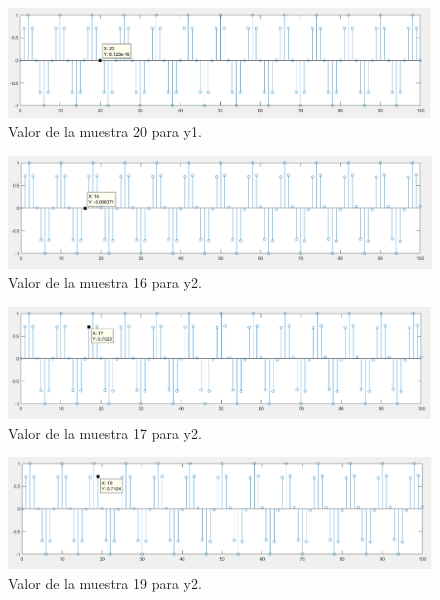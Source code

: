 \documentclass[12pt]{article}
\begin{document}
\begin{figure}[h]
    \centering
        \includegraphics[width=15cm]{IMAGENES/T1_val4.png}
        \caption{Valor de la muestra 20 para y1.}
\end{figure}
\vspace{100mm}
\begin{figure}[h]
    \centering
        \includegraphics[width=15cm]{IMAGENES/T1_val5.png}
        \caption{Valor de la muestra 16 para y2.}
\end{figure}
\vspace{100mm}
\begin{figure}[h]
    \centering
        \includegraphics[width=15cm]{IMAGENES/T1_val6.png}
        \caption{Valor de la muestra 17 para y2.}
\end{figure}

\begin{figure}[h]
    \centering
        \includegraphics[width=15cm]{IMAGENES/T1_val7.png}
        \caption{Valor de la muestra 19 para y2.}
\end{figure}
\end{document}
